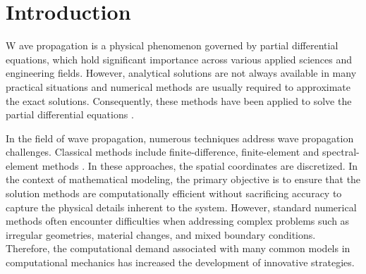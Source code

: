 \documentclass[11pt,twoside]{article}
\begin{document}
\section*{Introduction}

\lettrine{W}{ }ave propagation is a physical phenomenon governed by partial differential equations, which hold significant 
importance across various applied sciences and engineering fields. However, analytical solutions are not always available 
in many practical situations and numerical methods are usually required to approximate the exact solutions. Consequently, 
these methods have been applied to solve the partial differential equations \citep{Seriani2020}.

In the field of wave propagation, numerous techniques address wave propagation challenges. Classical methods include 
finite-difference, finite-element and spectral-element methods \citep{Moczo, virieux_review_2011, Igel2017,
komatitsch_introduction_1999,chaljub_spectral-element_2007}. In these approaches, the spatial coordinates are discretized. 
In the context of mathematical modeling, the primary objective is to ensure that the solution methods 
are computationally efficient without sacrificing accuracy to capture the physical details inherent to the 
system. However, standard numerical methods often encounter difficulties when addressing complex problems such as irregular 
geometries, material changes, and mixed boundary conditions. Therefore, the computational demand associated with many common 
models in computational mechanics has increased the development of innovative strategies.
\end{document}
